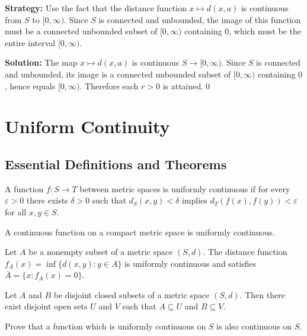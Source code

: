 \noindent\textbf{Strategy:} Use the fact that the distance function $x \mapsto d(x,a)$ is continuous from $S$ to $[0,\infty)$. Since $S$ is connected and unbounded, the image of this function must be a connected unbounded subset of $[0,\infty)$ containing $0$, which must be the entire interval $[0,\infty)$.

\bigskip\noindent\textbf{Solution:}
The map $x\mapsto d(x,a)$ is continuous $S\to[0,\infty)$. Since $S$ is connected and unbounded, its image is a connected unbounded subset of $[0,\infty)$ containing $0$, hence equals $[0,\infty)$. Therefore each $r>0$ is attained.\qed

\section{Uniform Continuity}

\subsection*{Essential Definitions and Theorems}

\begin{definition}
A function $f: S \to T$ between metric spaces is uniformly continuous if for every $\varepsilon > 0$ there exists $\delta > 0$ such that $d_S(x,y) < \delta$ implies $d_T(f(x), f(y)) < \varepsilon$ for all $x,y \in S$.
\end{definition}

\begin{theorem}
A continuous function on a compact metric space is uniformly continuous.
\end{theorem}

\begin{theorem}
Let $A$ be a nonempty subset of a metric space $(S,d)$. The distance function $f_A(x) = \inf\{d(x,y) : y \in A\}$ is uniformly continuous and satisfies $\overline{A} = \{x : f_A(x) = 0\}$.
\end{theorem}

\begin{theorem}
Let $A$ and $B$ be disjoint closed subsets of a metric space $(S,d)$. Then there exist disjoint open sets $U$ and $V$ such that $A \subseteq U$ and $B \subseteq V$.
\end{theorem}



\begin{problembox}
Prove that a function which is uniformly continuous on $S$ is also continuous on $S$.
\end{problembox}

